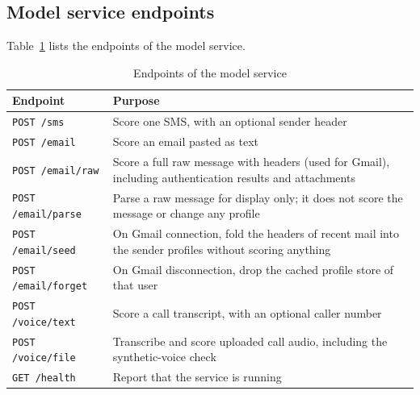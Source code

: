 {\subsection{Model service endpoints}
Table~\ref{tab:api} lists the endpoints of the model service.

\begin{table}[H]
\caption{Endpoints of the model service}
\label{tab:api}
\centering\small{}
\begin{tabular}{|p{3.4cm}|p{10.8cm}|}
\hline
\textbf{Endpoint} & \textbf{Purpose} \\ \hline
\texttt{POST /sms} & Score one SMS, with an optional sender header \\ \hline
\texttt{POST /email} & Score an email pasted as text \\ \hline
\texttt{POST /email/raw} & Score a full raw message with headers (used for Gmail), including authentication results and attachments \\ \hline
\texttt{POST /email/parse} & Parse a raw message for display only; it does not score the message or change any profile \\ \hline
\texttt{POST /email/seed} & On Gmail connection, fold the headers of recent mail into the sender profiles without scoring anything \\ \hline
\texttt{POST /email/forget} & On Gmail disconnection, drop the cached profile store of that user \\ \hline
\texttt{POST /voice/text} & Score a call transcript, with an optional caller number \\ \hline
\texttt{POST /voice/file} & Transcribe and score uploaded call audio, including the synthetic-voice check \\ \hline
\texttt{GET /health} & Report that the service is running \\ \hline
\end{tabular}
\end{table}

}
